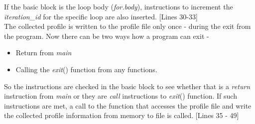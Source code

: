 \documentclass[10pt]{report}          %
\begin{document}
If the basic block is the loop body (\textit{for.body}), instructions to increment the \textit{iteration\_id} for the specific loop are also inserted. [Lines 30-33] \\

The collected profile is written to the profile file only once - during the exit from the program.  Now there can be two ways how a program can exit - 

\begin{itemize}

\item Return from \textit{main}
\item Calling the \textit{exit}() function from any functions.

\end{itemize}

So the instructions are checked in the basic block to see whether that is a \textit{return} instruction from \textit{main} or they are \textit{call} instructions to \textit{exit}() function.  If such instructions are met, a call to the function that accesses the profile file and write the collected profile information from memory to file is called. [Lines 35 - 49] \\
\end{document}
